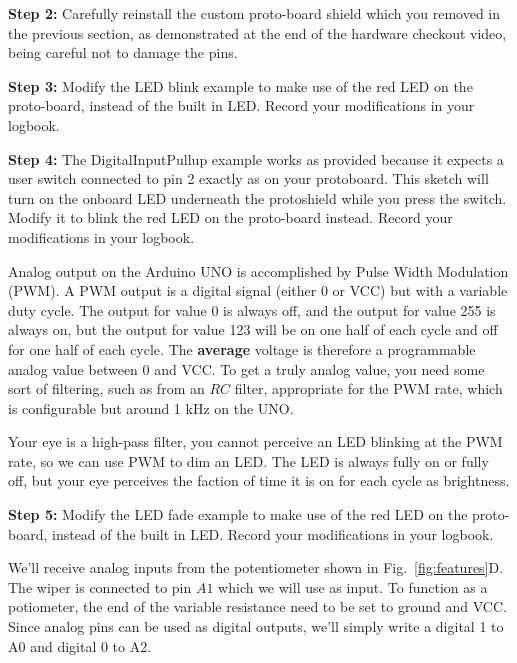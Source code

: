 \documentclass[12pt]{article}
\begin{document}
\vspace{0.5 cm}
\noindent
{\bf Step 2:} Carefully reinstall the custom proto-board shield which
you removed in the previous section, as demonstrated at the end of the
hardware checkout video, being careful not to damage the pins.

\vspace{0.5 cm}
\noindent
{\bf Step 3:} Modify the LED blink example to make use of the red LED
on the proto-board, instead of the built in LED.  Record your
modifications in your logbook.

\vspace{0.5 cm}
\noindent
{\bf Step 4:} The DigitalInputPullup example works as provided because
it expects a user switch connected to pin 2 exactly as on your
protoboard.  This sketch will turn on the onboard LED underneath the
protoshield while you press the switch.  Modify it to blink the red
LED on the proto-board instead.  Record your modifications in your logbook.

\vspace{0.5 cm}
Analog output on the Arduino UNO is accomplished by Pulse Width
Modulation (PWM).  A PWM output is a digital signal (either 0 or VCC)
but with a variable duty cycle. The output for value 0 is always off,
and the output for value 255 is always on, but the output for value
123 will be on one half of each cycle and off for one half of each
cycle.  The {\bf average} voltage is therefore a programmable analog
value between 0 and VCC.  To get a truly analog value, you need some
sort of filtering, such as from an $RC$ filter, appropriate for the
PWM rate, which is configurable but around 1 kHz on the UNO.

Your eye is a high-pass filter, you cannot perceive an LED blinking at
the PWM rate, so we can use PWM to dim an LED.  The LED is always
fully on or fully off, but your eye perceives the faction of time it
is on for each cycle as brightness.

\vspace{0.5 cm}
\noindent
{\bf Step 5:} Modify the LED fade example to make use of the red LED
on the proto-board, instead of the built in LED.  Record your
modifications in your logbook.  

\vspace{0.5 cm}
We'll receive analog inputs from the potentiometer shown in
Fig.~\ref{fig:features}D.  The wiper is connected to pin $A1$ which we
will use as input.  To function as a potiometer, the end of the
variable resistance need to be set to ground and VCC.  Since analog
pins can be used as digital outputs, we'll simply write a digital 1 to
A0 and digital 0 to A2.
\end{document}
